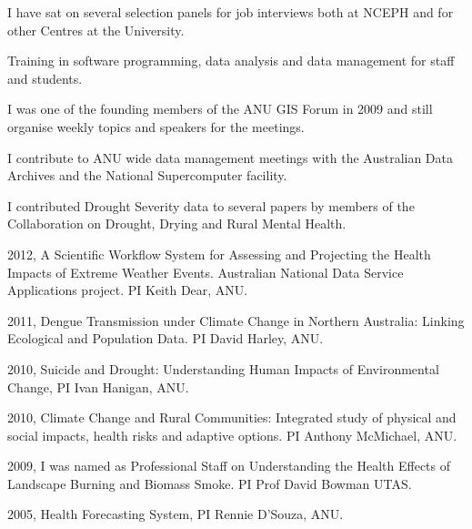 \documentclass[a4paper,11pt]{article}
\begin{document}
\renewcommand{\labelenumi}{\textsc{l}\theenumi.}
\begin{revnumerate}

\item I have sat on several selection panels for job interviews both at NCEPH and for other Centres at the University.

\item Training in software programming, data analysis and data management for staff and students.

\item I was one of the founding members of the ANU GIS Forum in 2009 and still organise weekly topics and speakers for the meetings.

\item I contribute to ANU wide data management meetings with the Australian Data Archives and the National Supercomputer facility.

\item I contributed Drought Severity data to several papers by members of the Collaboration on Drought, Drying and Rural Mental Health.
\end{revnumerate}
{}
\renewcommand{\labelenumi}{\textsc{m}\theenumi.}
\begin{revnumerate}
\item 2012, A Scientific Workflow System for Assessing and Projecting the Health Impacts of Extreme Weather Events. Australian National Data Service Applications project.  PI Keith Dear, ANU.	
\item 2011, Dengue Transmission under Climate Change in Northern Australia: Linking Ecological and Population Data. PI David Harley, ANU.	
\item 2010, Suicide and Drought: Understanding Human Impacts of Environmental Change, PI Ivan Hanigan, ANU.	
\item 2010, Climate Change and Rural Communities: Integrated study of physical and social impacts, health risks and adaptive options. PI Anthony McMichael, ANU. 	
\item 2009, I was named as Professional Staff on Understanding the Health Effects of Landscape Burning and Biomass Smoke. PI Prof David Bowman UTAS. 	
\item 2005, Health Forecasting System,	PI Rennie D'Souza, ANU.

\end{revnumerate}
\end{document}
